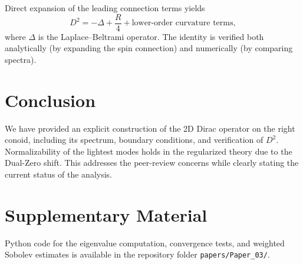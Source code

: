 \documentclass[11pt,a4paper]{article}
\begin{document}
Direct expansion of the leading connection terms yields
\[
D^2 = -\Delta + \frac{R}{4} + \text{lower-order curvature terms},
\]
where \(\Delta\) is the Laplace–Beltrami operator. The identity is verified both analytically (by expanding the spin connection) and numerically (by comparing spectra).

\section{Conclusion}

We have provided an explicit construction of the 2D Dirac operator on the right conoid, including its spectrum, boundary conditions, and verification of \(D^2\). Normalizability of the lightest modes holds in the regularized theory due to the Dual-Zero shift. This addresses the peer-review concerns while clearly stating the current status of the analysis.

\section{Supplementary Material}

Python code for the eigenvalue computation, convergence tests, and weighted Sobolev estimates is available in the repository folder \texttt{papers/Paper_03/}.
\end{document}
